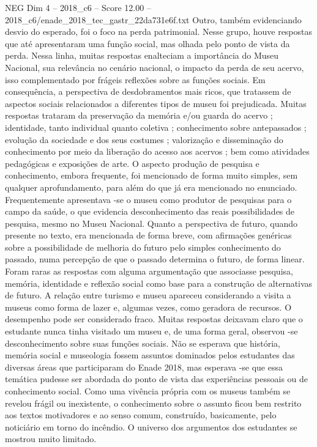 \begin{textsample}{NEG Dim 4 – 2018\_c6 – Score 12.00 – 2018\_c6/enade\_2018\_tec\_gastr\_22da731e6f.txt}
Outro, também evidenciando desvio do esperado, foi o foco na perda patrimonial.
Nesse grupo, houve respostas que até apresentaram uma função social, mas olhada pelo ponto de vista da perda.
Nessa linha, muitas respostas enalteciam a importância do Museu Nacional, sua relevância no cenário nacional, o impacto da perda de seu acervo, isso complementado por frágeis reflexões sobre as funções sociais.
Em consequência, a perspectiva de desdobramentos mais ricos, que tratassem de aspectos sociais relacionados a diferentes tipos de museu foi prejudicada.
Muitas respostas trataram da preservação da memória e/ou guarda do acervo ; identidade, tanto individual quanto coletiva ; conhecimento sobre antepassados ; evolução da sociedade e dos seus costumes ; valorização e disseminação do conhecimento por meio da liberação do acesso aos acervos ; bem como atividades pedagógicas e exposições de arte.
O aspecto produção de pesquisa e conhecimento, embora frequente, foi mencionado de forma muito simples, sem qualquer aprofundamento, para além do que já era mencionado no enunciado.
Frequentemente apresentava -se o museu como produtor de pesquisas para o campo da saúde, o que evidencia desconhecimento das reais possibilidades de pesquisa, mesmo no Museu Nacional.
Quanto a perspectiva de futuro, quando presente no texto, era mencionada de forma breve, com afirmações genéricas sobre a possibilidade de melhoria do futuro pelo simples conhecimento do passado, numa percepção de que o passado determina o futuro, de forma linear.
Foram raras as respostas com alguma argumentação que associasse pesquisa, memória, identidade e reflexão social como base para a construção de alternativas de futuro.
A relação entre turismo e museu apareceu considerando a visita a museus como forma de lazer e, algumas vezes, como geradora de recursos.
O desempenho pode ser considerado fraco.
Muitas respostas deixavam claro que o estudante nunca tinha visitado um museu e, de uma forma geral, observou -se desconhecimento sobre suas funções sociais.
Não se esperava que história, memória social e museologia fossem assuntos dominados pelos estudantes das diversas áreas que participaram do Enade 2018, mas esperava -se que essa temática pudesse ser abordada do ponto de vista das experiências pessoais ou de conhecimento social.
Como uma vivência própria com os museus também se revelou frágil ou inexistente, o conhecimento sobre o assunto ficou bem restrito aos textos motivadores e ao senso comum, construído, basicamente, pelo noticiário em torno do incêndio.
O universo dos argumentos dos estudantes se mostrou muito limitado.

\end{textsample}
